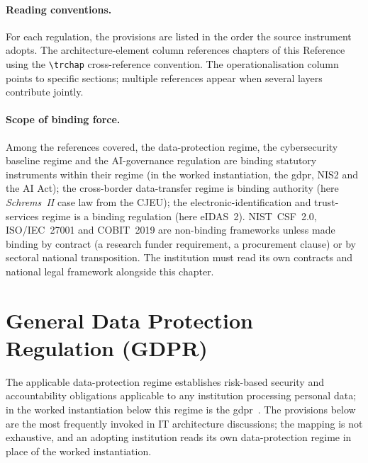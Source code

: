 \paragraph{Reading conventions.} For each regulation, the
provisions are listed in the order the source instrument adopts.
The architecture-element column references chapters of this
Reference using the \texttt{\textbackslash{}trchap} cross-reference
convention. The
operationalisation column points to specific sections; multiple
references appear when several layers contribute jointly.

\paragraph{Scope of binding force.} Among the references covered,
the data-protection regime, the cybersecurity baseline regime and
the AI-governance regulation are binding statutory instruments
within their regime (in the worked instantiation, the \gls{gdpr},
NIS2 and the AI Act); the cross-border data-transfer regime is
binding authority (here \emph{Schrems~II} case law from the CJEU);
the electronic-identification and trust-services regime is a
binding regulation (here eIDAS~2). NIST~CSF~2.0, ISO/IEC~27001 and
COBIT~2019 are non-binding frameworks unless made binding by
contract (a research funder requirement, a procurement clause) or
by sectoral national transposition. The institution must read its
own contracts and national legal framework alongside this chapter.

\section{General Data Protection Regulation (GDPR)}
\label{sec:rm-gdpr}

The applicable data-protection regime establishes risk-based
security and accountability obligations applicable to any
institution processing personal data; in the worked instantiation
below this regime is the \gls{gdpr}~\cite{gdpr}. The provisions
below are the most frequently invoked in IT architecture
discussions; the mapping is not exhaustive, and an adopting
institution reads its own data-protection regime in place of the
worked instantiation.


